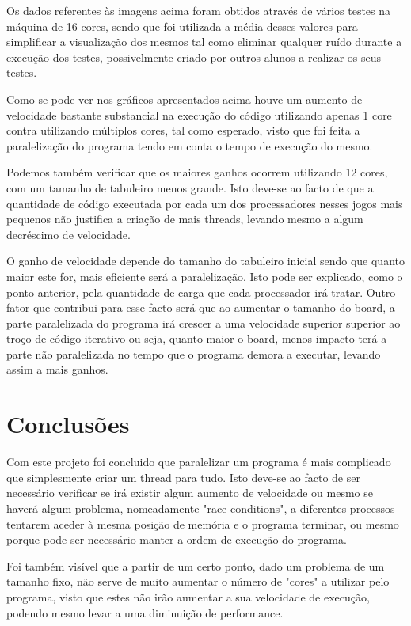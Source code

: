 \documentclass[a4paper]{article}
\begin{document}
Os dados referentes às imagens acima foram obtidos através de vários testes na máquina de 16 cores, sendo que foi utilizada a média desses valores para simplificar a visualização dos mesmos tal como eliminar qualquer ruído durante a execução dos testes, possivelmente criado por outros alunos a realizar os seus testes.

Como se pode ver nos gráficos apresentados acima houve um aumento de velocidade bastante substancial na execução do código utilizando apenas 1 core contra utilizando múltiplos cores, tal como esperado, visto que foi feita a paralelização do programa tendo em conta o tempo de execução do mesmo.


Podemos também verificar que os maiores ganhos ocorrem utilizando 12 cores, com um tamanho de tabuleiro menos grande. Isto deve-se ao facto de que a quantidade de código executada por cada um dos processadores nesses jogos mais pequenos não justifica a criação de mais threads, levando mesmo a algum decréscimo de velocidade. 

O ganho de velocidade depende do tamanho do tabuleiro inicial sendo que quanto maior este for, mais eficiente será a paralelização. Isto pode ser explicado, como o ponto anterior, pela quantidade de carga que cada processador irá tratar. Outro fator que contribui para esse facto será que ao aumentar o tamanho do board, a parte paralelizada do programa irá crescer a uma velocidade superior superior ao troço de código iterativo ou seja, quanto maior o board, menos impacto terá a parte não paralelizada no tempo que o programa demora a executar, levando assim a mais ganhos.

\section{Conclusões}
Com este projeto foi concluido que paralelizar um programa é mais complicado que simplesmente criar um thread para tudo. Isto deve-se ao facto de ser necessário verificar se irá existir algum aumento de velocidade ou mesmo se haverá algum problema, nomeadamente "race conditions", a diferentes processos tentarem aceder à mesma posição de memória e o programa terminar, ou mesmo porque pode ser necessário manter a ordem de execução do programa. 

Foi também visível que a partir de um certo ponto, dado um problema de um tamanho fixo, não serve de muito aumentar o número de "cores" a utilizar pelo programa, visto que estes não irão aumentar a sua velocidade de execução, podendo mesmo levar a uma diminuição de performance.  
\end{document}
